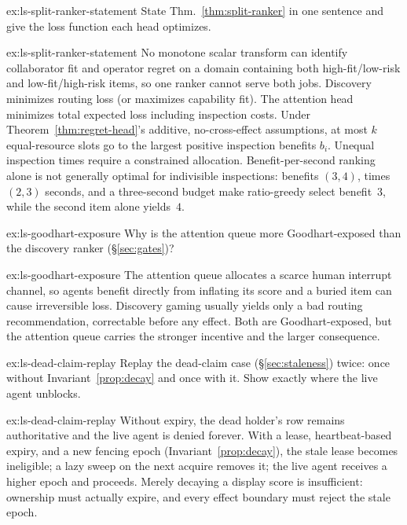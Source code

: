 \documentclass[11pt,a4paper]{article}
\theoremstyle{definition}
\theoremstyle{plain}
\begin{document}

\begin{pdexercise}[kind=Check,rating=1]{ex:ls-split-ranker-statement}
State Thm.~\ref{thm:split-ranker} in one sentence and give the loss function
each head optimizes.
\end{pdexercise}
\begin{pdsolution}{ex:ls-split-ranker-statement}
No monotone scalar transform can identify collaborator fit and operator regret
on a domain containing both high-fit/low-risk and low-fit/high-risk items, so
one ranker cannot serve both jobs. Discovery minimizes routing loss (or
maximizes capability fit). The attention head minimizes total expected loss
including inspection costs. Under Theorem~\ref{thm:regret-head}'s additive,
no-cross-effect assumptions, at most $k$ equal-resource slots go to the largest
positive inspection benefits $b_i$. Unequal inspection times require a
constrained allocation. Benefit-per-second ranking alone is not generally
optimal for indivisible inspections: benefits $(3,4)$, times $(2,3)$ seconds,
and a three-second budget make ratio-greedy select benefit~$3$, while the
second item alone yields~$4$.
\end{pdsolution}
\begin{pdexercise}[kind=Check,rating=1]{ex:ls-goodhart-exposure}
Why is the attention queue more Goodhart-exposed than the
discovery ranker (\S\ref{sec:gates})?
\end{pdexercise}
\begin{pdsolution}{ex:ls-goodhart-exposure}
The attention queue allocates a scarce human interrupt channel, so agents benefit directly from inflating its score and a buried item can cause irreversible loss. Discovery gaming usually yields only a bad routing recommendation, correctable before any effect. Both are Goodhart-exposed, but the attention queue carries the stronger incentive and the larger consequence.
\end{pdsolution}
\begin{pdexercise}[kind=Trace,rating=2]{ex:ls-dead-claim-replay}
Replay the dead-claim case (\S\ref{sec:staleness}) twice: once without
Invariant~\ref{prop:decay} and once with it. Show exactly where the live agent unblocks.
\end{pdexercise}
\begin{pdsolution}{ex:ls-dead-claim-replay}
Without expiry, the dead holder's row remains authoritative and the live agent is denied forever. With a lease, heartbeat-based expiry, and a new fencing epoch (Invariant~\ref{prop:decay}), the stale lease becomes ineligible; a lazy sweep on the next acquire removes it; the live agent receives a higher epoch and proceeds. Merely decaying a display score is insufficient: ownership must actually expire, and every effect boundary must reject the stale epoch.
\end{pdsolution}
\end{document}
